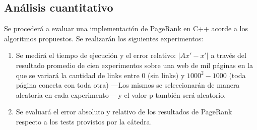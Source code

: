 \vspace{3em}
\subsection{Análisis cuantitativo} Se procederá a evaluar una implementación de PageRank en C++ acorde a los algoritmos propuestos. Se realizarán los siguientes experimentos: 
\vspace{1em}

\begin{enumerate}
    \item Se medirá el tiempo de ejecución y el error relativo: $|Ax' - x'|$ %
    a través del resultado promedio de cien experimentos sobre una web de mil páginas en la que se variará la cantidad de links entre $0$ (sin links) y $1000^2 - 1000$ (toda página conecta con toda otra) ---Los mismos se seleccionarán de manera aleatoria en cada experimento--- y el valor p también será aleatorio.
    \item Se evaluará el error absoluto y relativo de los resultados de PageRank respecto a los tests provistos por la cátedra.
\end{enumerate}
\vspace{1em}

